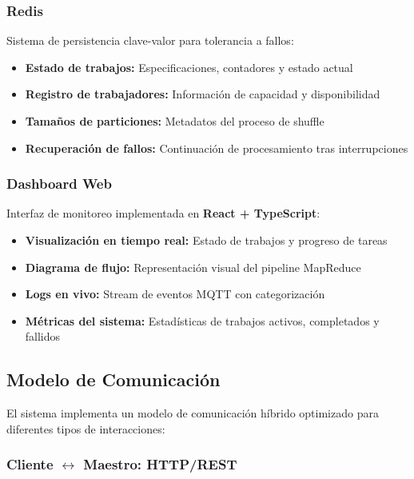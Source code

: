 \subsubsection{Redis}

Sistema de persistencia clave-valor para tolerancia a fallos:

\begin{itemize}
    \item \textbf{Estado de trabajos:} Especificaciones, contadores y estado actual
    \item \textbf{Registro de trabajadores:} Información de capacidad y disponibilidad
    \item \textbf{Tamaños de particiones:} Metadatos del proceso de shuffle
    \item \textbf{Recuperación de fallos:} Continuación de procesamiento tras interrupciones
\end{itemize}

\subsubsection{Dashboard Web}

Interfaz de monitoreo implementada en \textbf{React + TypeScript}:

\begin{itemize}
    \item \textbf{Visualización en tiempo real:} Estado de trabajos y progreso de tareas
    \item \textbf{Diagrama de flujo:} Representación visual del pipeline MapReduce
    \item \textbf{Logs en vivo:} Stream de eventos MQTT con categorización
    \item \textbf{Métricas del sistema:} Estadísticas de trabajos activos, completados y fallidos
\end{itemize}

\subsection{Modelo de Comunicación}

El sistema implementa un modelo de comunicación híbrido optimizado para diferentes tipos de interacciones:

\subsubsection{Cliente $\leftrightarrow$ Maestro: HTTP/REST}


